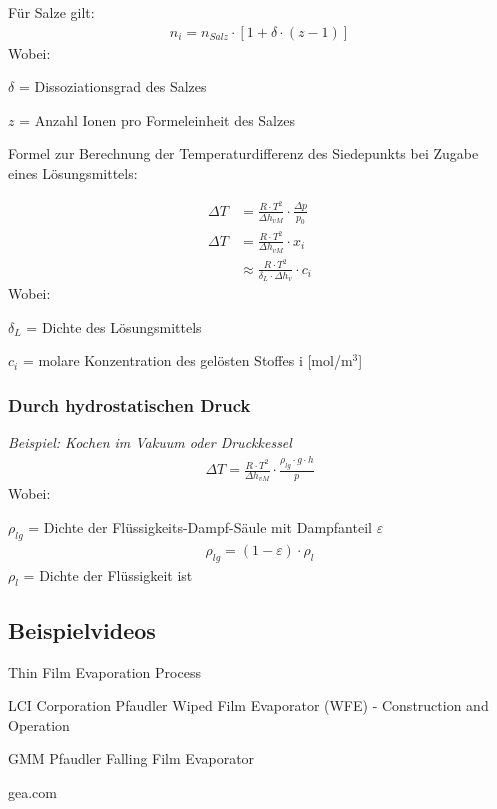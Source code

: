 \documentclass[a4paper,10pt,twoside]{article}
\begin{document}
Für Salze gilt:
\begin{align*}
n_i = n_{Salz} \cdot [1+ \delta \cdot (z-1)]
\end{align*}
Wobei: \par 
$\delta$ = Dissoziationsgrad des Salzes \par 
$z$ = Anzahl Ionen pro Formeleinheit des Salzes \pp

\pagebreak
Formel zur Berechnung der Temperaturdifferenz des Siedepunkts bei Zugabe eines Lösungsmittels:

\begin{align*}
\Delta T &= \frac{R \cdot T^2}{\Delta h_{vM}} \cdot \frac{\Delta p}{p_0} \\
\Delta T &= \frac{R \cdot T^2}{\Delta h_{vM}} \cdot x_i \\
&\approx \frac{R \cdot T^2}{\delta_L \cdot \Delta h_v} \cdot c_i
\end{align*}
\pp
Wobei:\par 
$\delta_L$ = Dichte des Lösungsmittels \par 
$c_i$ = molare Konzentration des gelösten Stoffes i [mol/m$^3$]

 


\subsubsection{Durch hydrostatischen Druck}
\textit{Beispiel: Kochen im Vakuum oder Druckkessel}
\begin{align*}
\Delta T = \frac{R \cdot T^2}{\Delta h_{vM}} \cdot \frac{\rho_{lg} \cdot g \cdot h}{p}
\end{align*}
Wobei: \par
$\rho_{lg}$ = Dichte der Flüssigkeits-Dampf-Säule mit Dampfanteil $\varepsilon$
\begin{align*}
\rho_{lg} = (1 - \varepsilon) \cdot \rho_l
\end{align*}
$\rho_l$ = Dichte der Flüssigkeit ist


\subsection{Beispielvideos}
Thin Film Evaporation Process \par 
LCI Corporation \pp
Pfaudler Wiped Film Evaporator (WFE) - Construction and Operation \par 
GMM Pfaudler \pp
Falling Film Evaporator \par 
gea.com \pp
\end{document}
